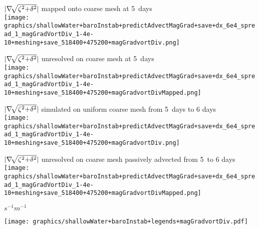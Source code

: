 {\begin{center}
\begin{minipage}{0.49\linewidth}\centering \small
$|\nabla\negthinspace\sqrt{\zeta^2\negmedspace + \negmedspace \delta^2}|$ mapped onto coarse mesh at 5\half\ days\\
\texttt{[image: graphics/shallowWater+baroInstab+predictAdvectMagGrad+save+dx\_6e4\_spread\_1\_magGradVortDiv\_1-4e-10+meshing+save\_518400+475200+magGradvortDiv.png]}
\end{minipage}
%
\begin{minipage}{0.49\linewidth}\centering \small
$|\nabla\negthinspace\sqrt{\zeta^2\negmedspace + \negmedspace \delta^2}|$ unresolved on coarse mesh at 5\half\ days\\
\texttt{[image: graphics/shallowWater+baroInstab+predictAdvectMagGrad+save+dx\_6e4\_spread\_1\_magGradVortDiv\_1-4e-10+meshing+save\_518400+475200+magGradvortDivMapped.png]}
\end{minipage}
%
\begin{minipage}{0.49\linewidth}\centering \small
$|\nabla\negthinspace\sqrt{\zeta^2\negmedspace + \negmedspace \delta^2}|$ simulated on uniform coarse mesh from 5\half\ days to 6 days\\
\texttt{[image: graphics/shallowWater+baroInstab+predictAdvectMagGrad+save+dx\_6e4\_spread\_1\_magGradVortDiv\_1-4e-10+meshing+save\_518400+475200+magGradvortDiv.png]}
\end{minipage}
%
\begin{minipage}{0.49\linewidth}\centering \small
$|\nabla\negthinspace\sqrt{\zeta^2\negmedspace + \negmedspace \delta^2}|$ unresolved on coarse mesh passively advected from 5\half\ to 6 days\\
\texttt{[image: graphics/shallowWater+baroInstab+predictAdvectMagGrad+save+dx\_6e4\_spread\_1\_magGradVortDiv\_1-4e-10+meshing+save\_518400+475200+magGradvortDivMapped.png]}
\end{minipage}
\begin{minipage}{0.12\linewidth}
$s^{-1}m^{-1}$
\end{minipage}\begin{minipage}{0.87\linewidth}
\texttt{[image: graphics/shallowWater+baroInstab+legends+magGradvortDiv.pdf]}
\end{minipage}


\end{center}}
